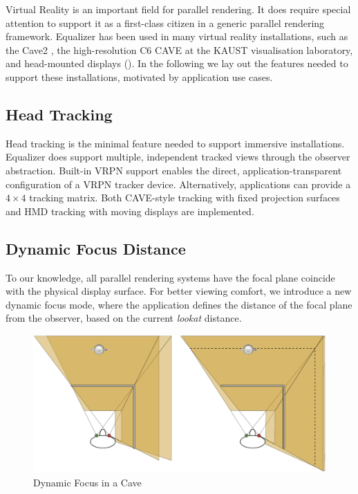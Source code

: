 Virtual Reality is an important field for parallel rendering. It does require
special attention to support it as a first-class citizen in a generic parallel
rendering framework. \textsf{Equalizer} has been used in many virtual reality
installations, such as the Cave2 \cite{FNTTL:13}, the high-resolution C6 CAVE
at the KAUST visualisation laboratory, and head-mounted displays
(). In the following we lay out the features needed to support
these installations, motivated by application use cases.

\subsection{Head Tracking}

Head tracking is the minimal feature needed to support immersive installations.
\textsf{Equalizer} does support multiple, independent tracked views through the
observer abstraction. Built-in VRPN support enables the direct,
application-transparent configuration of a VRPN tracker device. Alternatively,
applications can provide a $4\times 4$ tracking matrix. Both CAVE-style tracking
with fixed projection surfaces and HMD tracking with moving displays are
implemented.

\subsection{Dynamic Focus Distance}

To our knowledge, all parallel rendering systems have the focal plane coincide
with the physical display surface. For better viewing comfort, we introduce a
new dynamic focus mode, where the application defines the distance of the focal
plane from the observer, based on the current \textit{lookat} distance.

\begin{figure}[h!t]\center
 \includegraphics[width=.9\textwidth]{images/focus}
 {\caption{\label{fFocus}Dynamic Focus in a Cave}}
\end{figure}

